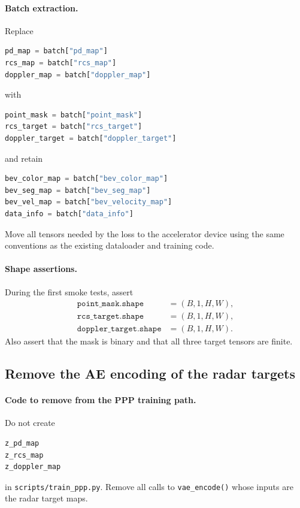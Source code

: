 \documentclass[11pt,a4paper]{article}
\begin{document}
\paragraph{Batch extraction.}
Replace
\begin{lstlisting}[language=Python]
pd_map = batch["pd_map"]
rcs_map = batch["rcs_map"]
doppler_map = batch["doppler_map"]
\end{lstlisting}
with
\begin{lstlisting}[language=Python]
point_mask = batch["point_mask"]
rcs_target = batch["rcs_target"]
doppler_target = batch["doppler_target"]
\end{lstlisting}
and retain
\begin{lstlisting}[language=Python]
bev_color_map = batch["bev_color_map"]
bev_seg_map = batch["bev_seg_map"]
bev_vel_map = batch["bev_velocity_map"]
data_info = batch["data_info"]
\end{lstlisting}

Move all tensors needed by the loss to the accelerator device using the same conventions as the existing dataloader and training code.

\paragraph{Shape assertions.}
During the first smoke tests, assert
\begin{align*}
\texttt{point\_mask.shape} &= (B,1,H,W),\\
\texttt{rcs\_target.shape} &= (B,1,H,W),\\
\texttt{doppler\_target.shape} &= (B,1,H,W).
\end{align*}
Also assert that the mask is binary and that all three target tensors are finite.

\subsection{Remove the AE encoding of the radar targets}

\paragraph{Code to remove from the PPP training path.}
Do not create
\begin{lstlisting}
z_pd_map
z_rcs_map
z_doppler_map
\end{lstlisting}
in \texttt{scripts/train\_ppp.py}. Remove all calls to \texttt{vae\_encode()} whose inputs are the radar target maps.
\end{document}
